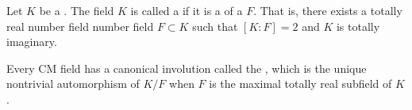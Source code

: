 \begin{definition}[CM Field] \label{definition:cm_field}
Let $K$ be a .
The field $K$ is called a  if it is a   of a   $F$. That is, there exists a totally real number field number field $F \subset K$ such that $[K : F] = 2$ and $K$ is totally imaginary.

Every CM field has a canonical involution called the , which is the unique nontrivial automorphism of $K/F$ when $F$ is the maximal totally real subfield of $K$.
\end{definition}
